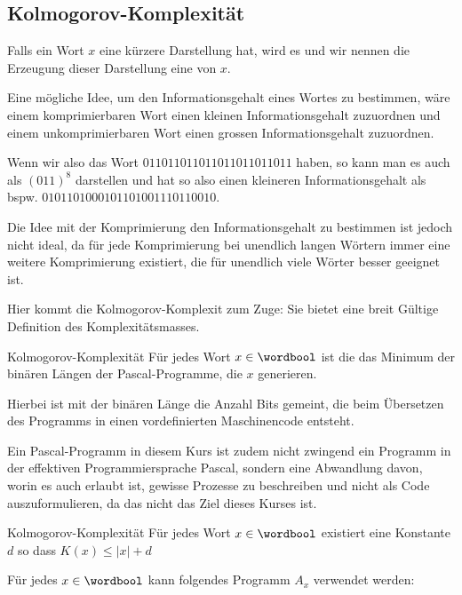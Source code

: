 \newpage
\subsection{Kolmogorov-Komplexität}
Falls ein Wort $x$ eine kürzere Darstellung hat, wird es  und wir nennen die Erzeugung dieser Darstellung eine  von $x$.

Eine mögliche Idee, um den Informationsgehalt eines Wortes zu bestimmen, wäre einem komprimierbaren Wort einen kleinen Informationsgehalt zuzuordnen und einem unkomprimierbaren Wort einen grossen Informationsgehalt zuzuordnen.

Wenn wir also das Wort $011011011011011011011011$ haben, so kann man es auch als $(011)^8$ darstellen und hat so also einen kleineren Informationsgehalt als bspw. $0101101000101101001110110010$.

Die Idee mit der Komprimierung den Informationsgehalt zu bestimmen ist jedoch nicht ideal, da für jede Komprimierung bei unendlich langen Wörtern immer eine weitere Komprimierung existiert, die für unendlich viele Wörter besser geeignet ist.

Hier kommt die Kolmogorov-Komplexit zum Zuge: Sie bietet eine breit Gültige Definition des Komplexitätsmasses.


\begin{definition}[]{Kolmogorov-Komplexität}
    Für jedes Wort $x \in \wordbool$ ist die  das Minimum der binären Längen der Pascal-Programme, die $x$ generieren.
\end{definition}

Hierbei ist mit der binären Länge die Anzahl Bits gemeint, die beim Übersetzen des Programms in einen vordefinierten Maschinencode entsteht.

Ein Pascal-Programm in diesem Kurs ist zudem nicht zwingend ein Programm in der effektiven Programmiersprache Pascal, sondern eine Abwandlung davon, worin es auch erlaubt ist, gewisse Prozesse zu beschreiben und nicht als Code auszuformulieren, da das nicht das Ziel dieses Kurses ist.


\begin{lemma}[]{Kolmogorov-Komplexität}
    Für jedes Wort $x \in \wordbool$ existiert eine Konstante $d$ so dass $K(x) \leq |x| + d$
\end{lemma}
\inlineproof Für jedes $x \in \wordbool$ kann folgendes Programm $A_x$ verwendet werden:

